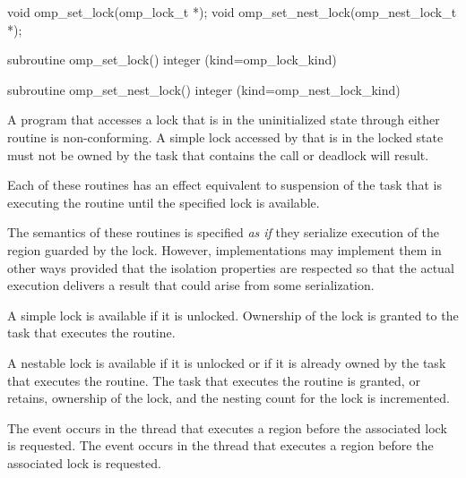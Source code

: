 \format
\begin{ccppspecific}
\begin{ompcFunction}
void omp_set_lock(omp_lock_t *);
void omp_set_nest_lock(omp_nest_lock_t *);
\end{ompcFunction}
\end{ccppspecific}

\begin{fortranspecific}
\begin{ompfSubroutine}
subroutine omp_set_lock()
integer (kind=omp_lock_kind) 

subroutine omp_set_nest_lock()
integer (kind=omp_nest_lock_kind) 
\end{ompfSubroutine}
\end{fortranspecific}

\constraints
A program that accesses a lock that is in the uninitialized state 
through either routine is non-conforming. A simple lock accessed by 
 that is in the locked state must not be owned 
by the task that contains the call or deadlock will result.

\effect
Each of these routines has an effect equivalent to suspension of the task
that is executing the routine until the specified lock is available.

\begin{note} The semantics of these routines is specified \emph{as if} 
they serialize execution of the region guarded by the lock. However, 
implementations may implement them in other ways provided that the 
isolation properties are respected so that the actual execution 
delivers a result that could arise from some serialization.
\end{note}

A simple lock is available if it is unlocked. Ownership of the lock is
granted to the task that executes the routine.

A nestable lock is available if it is unlocked or if it is already owned by
the task that executes the routine. The task that executes the routine is granted,
or retains, ownership of the lock, and the nesting count for the lock is
incremented.

\events
The  event occurs in the thread that executes a 
 region before the associated lock is requested.
The  event occurs in the thread that executes
a  region before the associated lock is requested.

